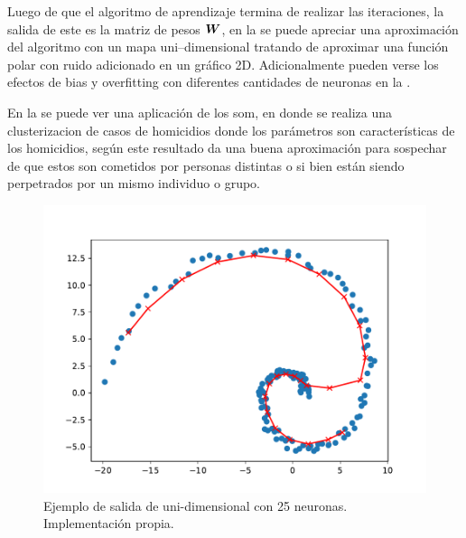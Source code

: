 Luego de que el algoritmo de aprendizaje termina de realizar las iteraciones, la salida de este es la matriz de pesos ${\bm{W}}$, en la  se puede apreciar una aproximación del algoritmo con un mapa uni--dimensional tratando de aproximar una función polar con ruido adicionado en un gráfico 2D. Adicionalmente pueden verse los efectos de \gls{bias} y \gls{overfitting} con diferentes cantidades de neuronas en la .

En la  se puede ver una aplicación de los \gls{som}, en donde se realiza una clusterizacion de casos de homicidios donde los parámetros son características de los homicidios, según \cite{mena2003investigative} este resultado da una buena aproximación para sospechar de que estos son cometidos por personas distintas o si bien están siendo perpetrados por un mismo individuo o grupo.

\begin{figure}[H]
\centering
\includegraphics[width=\textwidth]{Figures/som-implementation-example25.pdf}
\decoRule
\caption[Ejemplo de salida de  uni-dimensional]{Ejemplo de salida de  uni-dimensional con 25 neuronas. Implementación propia.}
\label{fig:som-impl-example}
\end{figure}

